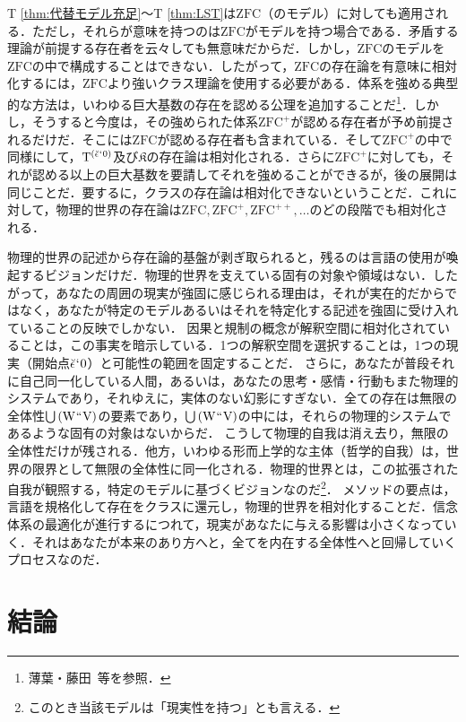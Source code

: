 T \ref{thm:代替モデル充足}〜T \ref{thm:LST}は$\mathrm{ZFC}$（のモデル）に対しても適用される．ただし，それらが意味を持つのは$\mathrm{ZFC}$がモデルを持つ場合である．矛盾する理論が前提する存在者を云々しても無意味だからだ．しかし，$\mathrm{ZFC}$のモデルを$\mathrm{ZFC}$の中で構成することはできない．したがって，$\mathrm{ZFC}$の存在論を有意味に相対化するには，$\mathrm{ZFC}$より強いクラス理論を使用する必要がある．体系を強める典型的な方法は，いわゆる巨大基数の存在を認める公理を追加することだ\footnote{
    薄葉・藤田~\cite{薄葉}等を参照．
}．しかし，そうすると今度は，その強められた体系$\mathrm{ZFC}^{+}$が認める存在者が予め前提されるだけだ．そこには$\mathrm{ZFC}$が認める存在者も含まれている．そして$\mathrm{ZFC}^{+}$の中で同様にして，$\mathrm{T}^{(\breve{\epsilon}{\mspace{1mu}{`}\mspace{1mu}} 0)}$及び$\mathfrak{K}$の存在論は相対化される．さらに$\mathrm{ZFC}^{+}$に対しても，それが認める以上の巨大基数を要請してそれを強めることができるが，後の展開は同じことだ．要するに，クラスの存在論は相対化できないということだ．これに対して，物理的世界の存在論は$ \mathrm{ZFC},\mathrm{ZFC}^{+},\mathrm{ZFC}^{++},\dots $のどの段階でも相対化される．

物理的世界の記述から存在論的基盤が剥ぎ取られると，残るのは言語の使用が喚起するビジョンだけだ．物理的世界を支えている固有の対象や領域はない．したがって，あなたの周囲の現実が強固に感じられる理由は，それが実在的だからではなく，あなたが特定のモデルあるいはそれを特定化する記述を強固に受け入れていることの反映でしかない．
因果と規制の概念が解釈空間に相対化されていることは，この事実を暗示している．1つの解釈空間を選択することは，1つの現実（開始点$ \breve{\epsilon}{\mspace{1mu}{`}\mspace{1mu}} 0 $）と可能性の範囲を固定することだ．
さらに，あなたが普段それに自己同一化している人間，あるいは，あなたの思考・感情・行動もまた物理的システムであり，それゆえに，実体のない幻影にすぎない．全ての存在は無限の全体性${\textstyle\bigcup}\mspace{3mu}(\mathrm{W}{\mspace{1mu}{``}\mspace{1mu}}\mathrm{V})$の要素であり，${\textstyle\bigcup}\mspace{3mu}(\mathrm{W}{\mspace{1mu}{``}\mspace{1mu}}\mathrm{V})$の中には，それらの物理的システムであるような固有の対象はないからだ．
こうして物理的自我は消え去り，無限の全体性だけが残される．他方，いわゆる形而上学的な主体（哲学的自我）は，世界の限界として無限の全体性に同一化される．物理的世界とは，この拡張された自我が観照する，特定のモデルに基づくビジョンなのだ\footnote{このとき当該モデルは「現実性を持つ」とも言える．}．
メソッドの要点は，言語を規格化して存在をクラスに還元し，物理的世界を相対化することだ．信念体系の最適化が進行するにつれて，現実があなたに与える影響は小さくなっていく．それはあなたが本来のあり方へと，全てを内在する全体性へと回帰していくプロセスなのだ．

\section{結論}
\label{sec:結論}


